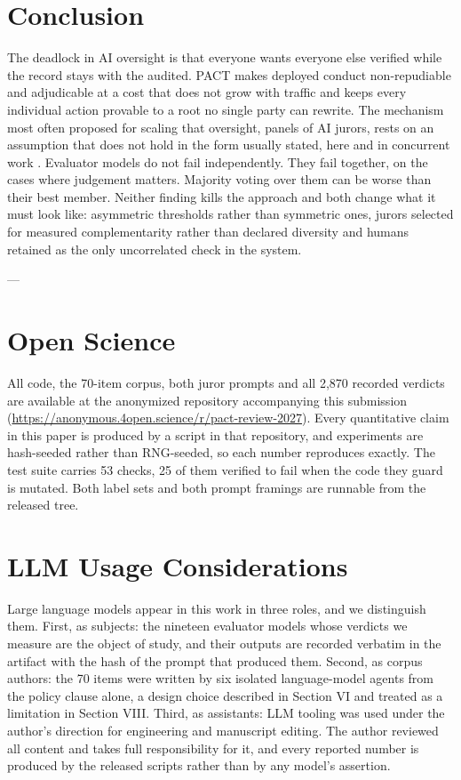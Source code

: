 \documentclass[conference]{IEEEtran}
\begin{document}
\section{Conclusion}

The deadlock in AI oversight is that everyone wants everyone else verified while the record stays with the audited. PACT makes deployed conduct non-repudiable and adjudicable at a cost that does not grow with traffic and keeps every individual action provable to a root no single party can rewrite. The mechanism most often proposed for scaling that oversight, panels of AI jurors, rests on an assumption that does not hold in the form usually stated, here and in concurrent work \cite{r39,r40}. Evaluator models do not fail independently. They fail together, on the cases where judgement matters. Majority voting over them can be worse than their best member. Neither finding kills the approach and both change what it must look like: asymmetric thresholds rather than symmetric ones, jurors selected for measured complementarity rather than declared diversity and humans retained as the only uncorrelated check in the system.

---

\section*{Open Science}

All code, the 70-item corpus, both juror prompts and all 2,870 recorded verdicts are available at the anonymized repository accompanying this submission (\url{https://anonymous.4open.science/r/pact-review-2027}). Every quantitative claim in this paper is produced by a script in that repository, and experiments are hash-seeded rather than RNG-seeded, so each number reproduces exactly. The test suite carries 53 checks, 25 of them verified to fail when the code they guard is mutated. Both label sets and both prompt framings are runnable from the released tree.

\section*{LLM Usage Considerations}

Large language models appear in this work in three roles, and we distinguish them. First, as subjects: the nineteen evaluator models whose verdicts we measure are the object of study, and their outputs are recorded verbatim in the artifact with the hash of the prompt that produced them. Second, as corpus authors: the 70 items were written by six isolated language-model agents from the policy clause alone, a design choice described in Section VI and treated as a limitation in Section VIII. Third, as assistants: LLM tooling was used under the author's direction for engineering and manuscript editing. The author reviewed all content and takes full responsibility for it, and every reported number is produced by the released scripts rather than by any model's assertion.
\end{document}
